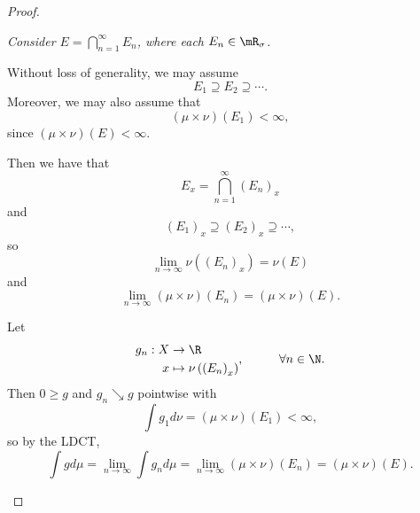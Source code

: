 \documentclass[pmath451]{subfiles}
\begin{document}
\begin{proof}
        \begin{case}
            \textit{Consider $E=\bigcap^{\infty}_{n=1}E_n$, where each $E_n\in\mR_{\sigma}$.}

            Without loss of generality, we may assume
            \begin{equation*}
                E_1\supseteq E_2\supseteq\cdots.
            \end{equation*}
            Moreover, we may also assume that
            \begin{equation*}
                \left( \mu\times\nu \right)\left( E_1 \right) < \infty,
            \end{equation*}
            since $\left( \mu\times\nu \right)\left( E \right)<\infty$.

            Then we have that
            \begin{equation*}
                E_x = \bigcap^{\infty}_{n=1} \left( E_n \right)_x
            \end{equation*}
            and
            \begin{equation*}
                \left( E_1 \right)_x\supseteq\left( E_2 \right)_x\supseteq\cdots,
            \end{equation*}
            so
            \begin{equation*}
                \lim_{n\to\infty}\nu\left( \left( E_n \right)_x \right) = \nu\left( E \right)
            \end{equation*}
            and
            \begin{equation*}
                \lim_{n\to\infty}\left( \mu\times\nu \right)\left( E_n \right) = \left( \mu\times\nu \right)\left( E \right).
            \end{equation*}

            Let
            \begin{equation*}
                \begin{aligned}
                    g_n:X&\to\R\\
                    x&\mapsto \nu\left( \left( E_n \right)_x \right)
                \end{aligned} ,\hspace{1cm}\forall n\in\N.
            \end{equation*}
            Then $0\geq g$ and $g_n\searrow g$ pointwise with
            \begin{equation*}
                \int g_1d\nu = \left( \mu\times\nu \right)\left( E_1 \right) < \infty,
            \end{equation*}
            so by the LDCT, 
            \begin{equation*}
                \int gd\mu = \lim_{n\to\infty}\int g_nd\mu = \lim_{n\to\infty}\left( \mu\times\nu \right)\left( E_n \right) = \left( \mu\times\nu \right)\left( E \right).
            \end{equation*}
        \end{case}
    \end{proof}
\end{document}
